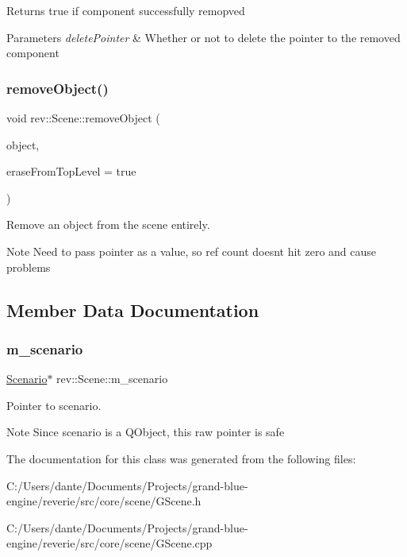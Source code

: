Returns true if component successfully remopved 
\begin{DoxyParams}{Parameters}
{\em delete\+Pointer} & Whether or not to delete the pointer to the removed component \\
\hline
\end{DoxyParams}
\mbox{\label{classrev_1_1_scene_ae6b55d9ed736c0687ba1b60bd07faff7}} 
\subsubsection{\texorpdfstring{removeObject()}{removeObject()}}
{\footnotesize\ttfamily void rev\+::\+Scene\+::remove\+Object (\begin{DoxyParamCaption}\item[{std\+::shared\+\_\+ptr$<$ \mbox{\hyperlink{classrev_1_1_scene_object}{Scene\+Object}} $>$}]{object,  }\item[{bool}]{erase\+From\+Top\+Level = {\ttfamily true} }\end{DoxyParamCaption})}



Remove an object from the scene entirely. 

\begin{DoxyNote}{Note}
Need to pass pointer as a value, so ref count doesn\textquotesingle{}t hit zero and cause problems 
\end{DoxyNote}


\subsection{Member Data Documentation}
\mbox{\label{classrev_1_1_scene_a4dedf53fbaa9c912c39a89de89cdc628}} 
\subsubsection{\texorpdfstring{m\_scenario}{m\_scenario}}
{\footnotesize\ttfamily \mbox{\hyperlink{classrev_1_1_scenario}{Scenario}}$\ast$ rev\+::\+Scene\+::m\+\_\+scenario\hspace{0.3cm}{\ttfamily [protected]}}



Pointer to scenario. 

\begin{DoxyNote}{Note}
Since scenario is a Q\+Object, this raw pointer is safe 
\end{DoxyNote}


The documentation for this class was generated from the following files\+:\begin{DoxyCompactItemize}
\item 
C\+:/\+Users/dante/\+Documents/\+Projects/grand-\/blue-\/engine/reverie/src/core/scene/G\+Scene.\+h\item 
C\+:/\+Users/dante/\+Documents/\+Projects/grand-\/blue-\/engine/reverie/src/core/scene/G\+Scene.\+cpp\end{DoxyCompactItemize}
